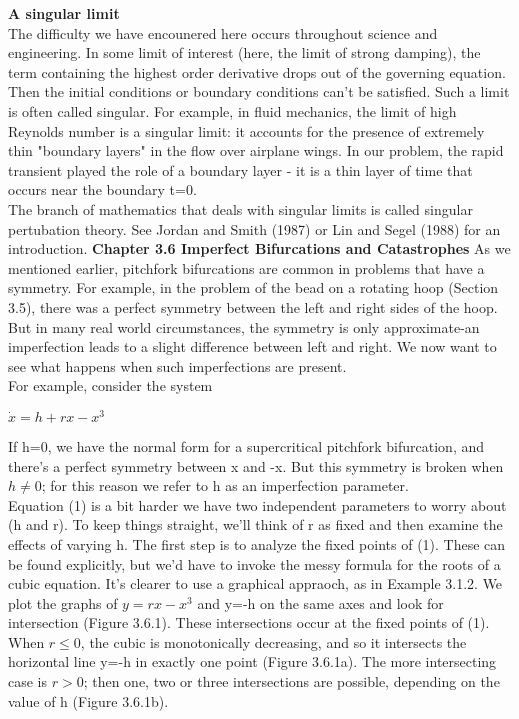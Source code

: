 \documentclass{article}
\newcommand\tab[1][1cm]{\hspace*{#1}}
\begin{document}
\textbf {A singular limit}
\\ \tab The difficulty we have encounered here occurs throughout science and engineering. In some limit of interest (here, the limit of strong damping), the term containing the highest order derivative drops out of the governing equation. Then the initial conditions or boundary conditions can't be satisfied. Such a limit is often called singular. For example, in fluid mechanics, the limit of high Reynolds number is a singular limit: it accounts for the presence of extremely thin "boundary layers" in the flow over airplane wings. In our problem, the rapid transient played the role of a boundary layer - it is a thin layer of time that occurs near the boundary t=0. \\
\tab The branch of mathematics that deals with singular limits is called singular pertubation theory. See Jordan and Smith (1987) or Lin and Segel (1988) for an introduction. 
\textbf {Chapter 3.6 Imperfect Bifurcations and Catastrophes}
As we mentioned earlier, pitchfork bifurcations are common in problems that have a symmetry. For example, in the problem of the bead on a rotating hoop (Section 3.5), there was a perfect symmetry between the left and right sides of the hoop. But in many real world circumstances, the symmetry is only approximate-an imperfection leads to a slight difference between left and right. We now want to see what happens when such imperfections are present. \\
\tab For example, consider the system
\begin{center}
$\dot{x}=h+rx-x^{3}$
\end{center}
If h=0, we have the normal form for a supercritical pitchfork bifurcation, and there's a perfect symmetry between x and -x. But this symmetry is broken when $h \neq 0$; for this reason we refer to h as an imperfection parameter. \\
\tab Equation (1) is a bit harder we have two independent parameters to worry about (h and r). To keep things straight, we'll think of r as fixed and then examine the effects of varying h. The first step is to analyze the fixed points of (1). These can be found explicitly, but we'd have to invoke the messy formula for the roots of a cubic equation. It's clearer to use a graphical appraoch, as in Example 3.1.2. We plot the graphs of $y=rx-x^{3}$ and y=-h on the same axes and look for intersection (Figure 3.6.1). These intersections occur at the fixed points of (1). When $r \leq 0$, the cubic is monotonically decreasing, and so it intersects the horizontal line y=-h in exactly one point (Figure 3.6.1a). The more intersecting case is $r >0$; then one, two or three intersections are possible, depending on the value of h (Figure 3.6.1b). \\
\end{document}
